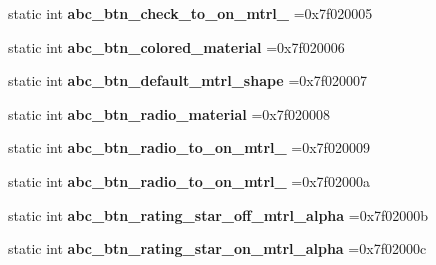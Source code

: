 \begin{DoxyCompactItemize}
static int {\bfseries abc\+\_\+btn\+\_\+check\+\_\+to\+\_\+on\+\_\+mtrl\+\_} =0x7f020005
\item 
\mbox{\label{classandroid_1_1support_1_1v7_1_1appcompat_1_1R_1_1drawable_a387dd085e9a44ab625cb87db77ef9e02}} 
static int {\bfseries abc\+\_\+btn\+\_\+colored\+\_\+material} =0x7f020006
\item 
\mbox{\label{classandroid_1_1support_1_1v7_1_1appcompat_1_1R_1_1drawable_a8a83a23e1a82ef3e092ab910bdc26e65}} 
static int {\bfseries abc\+\_\+btn\+\_\+default\+\_\+mtrl\+\_\+shape} =0x7f020007
\item 
\mbox{\label{classandroid_1_1support_1_1v7_1_1appcompat_1_1R_1_1drawable_ac42a059d0ca19f475bc7b9fe29f4b603}} 
static int {\bfseries abc\+\_\+btn\+\_\+radio\+\_\+material} =0x7f020008
\item 
\mbox{\label{classandroid_1_1support_1_1v7_1_1appcompat_1_1R_1_1drawable_a27e579b32cec84eb7f17761b3c4a3bd7}} 
static int {\bfseries abc\+\_\+btn\+\_\+radio\+\_\+to\+\_\+on\+\_\+mtrl\+\_} =0x7f020009
\item 
\mbox{\label{classandroid_1_1support_1_1v7_1_1appcompat_1_1R_1_1drawable_a356c7a9396577c4d457e28a260c0889e}} 
static int {\bfseries abc\+\_\+btn\+\_\+radio\+\_\+to\+\_\+on\+\_\+mtrl\+\_} =0x7f02000a
\item 
\mbox{\label{classandroid_1_1support_1_1v7_1_1appcompat_1_1R_1_1drawable_aa00c10bfb244a6ea27994fdd5b3e57ec}} 
static int {\bfseries abc\+\_\+btn\+\_\+rating\+\_\+star\+\_\+off\+\_\+mtrl\+\_\+alpha} =0x7f02000b
\item 
\mbox{\label{classandroid_1_1support_1_1v7_1_1appcompat_1_1R_1_1drawable_a3a522930145bcf23dfa3b582bcd00ebe}} 
static int {\bfseries abc\+\_\+btn\+\_\+rating\+\_\+star\+\_\+on\+\_\+mtrl\+\_\+alpha} =0x7f02000c
\item 

\end{DoxyCompactItemize}
